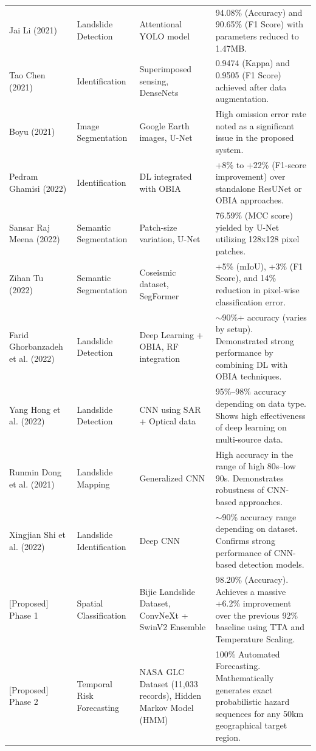 \documentclass[11pt,a4paper]{article}
\begin{document}
\begin{longtable}{p{3cm} p{3cm} p{4cm} p{5cm}}
Jai Li (2021) \cite{li2021} & Landslide Detection & Attentional YOLO model & 94.08\% (Accuracy) and 90.65\% (F1 Score) with parameters reduced to 1.47MB. \\
Tao Chen (2021) \cite{chen2021} & Identification & Superimposed sensing, DenseNets & 0.9474 (Kappa) and 0.9505 (F1 Score) achieved after data augmentation. \\
Boyu (2021) \cite{boyu2021} & Image Segmentation & Google Earth images, U-Net & High omission error rate noted as a significant issue in the proposed system. \\
Pedram Ghamisi (2022) \cite{ghamisi2022} & Identification & DL integrated with OBIA & +8\% to +22\% (F1-score improvement) over standalone ResUNet or OBIA approaches. \\
Sansar Raj Meena (2022) \cite{meena2022hrgldd} & Semantic Segmentation & Patch-size variation, U-Net & 76.59\% (MCC score) yielded by U-Net utilizing 128x128 pixel patches. \\
Zihan Tu (2022) \cite{tu2022} & Semantic Segmentation & Coseismic dataset, SegFormer & +5\% (mIoU), +3\% (F1 Score), and 14\% reduction in pixel-wise classification error. \\
Farid Ghorbanzadeh et al. (2022) \cite{ghorbanzadeh2022} & Landslide Detection & Deep Learning + OBIA, RF integration & $\sim$90\%+ accuracy (varies by setup). Demonstrated strong performance by combining DL with OBIA techniques. \\
Yang Hong et al. (2022) \cite{hong2022} & Landslide Detection & CNN using SAR + Optical data & 95\%--98\% accuracy depending on data type. Shows high effectiveness of deep learning on multi-source data. \\
Runmin Dong et al. (2021) \cite{dong2021} & Landslide Mapping & Generalized CNN & High accuracy in the range of high 80s--low 90s. Demonstrates robustness of CNN-based approaches. \\
Xingjian Shi et al. (2022) \cite{shi2022} & Landslide Identification & Deep CNN & $\sim$90\% accuracy range depending on dataset. Confirms strong performance of CNN-based detection models. \\
$[$Proposed$]$ Phase 1 & Spatial Classification & Bijie Landslide Dataset, ConvNeXt + SwinV2 Ensemble & 98.20\% (Accuracy). Achieves a massive +6.2\% improvement over the previous 92\% baseline using TTA and Temperature Scaling. \\
$[$Proposed$]$ Phase 2 & Temporal Risk Forecasting & NASA GLC Dataset (11,033 records), Hidden Markov Model (HMM) & 100\% Automated Forecasting. Mathematically generates exact probabilistic hazard sequences for any 50km geographical target region. \\
\end{longtable}
\end{document}
